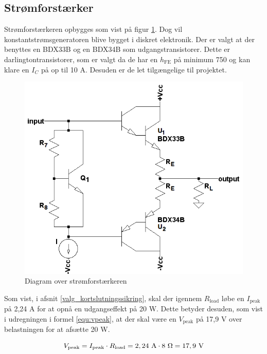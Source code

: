 \subsection{Strømforstærker}
\label{effekt_stroemforstaerker}
Strømforstærkeren opbygges som vist på figur \ref{fig:blokdiagram-stroem}. Dog vil konstantstrømsgeneratoren blive bygget i diskret elektronik. Der er valgt at der benyttes en BDX33B og en BDX34B \cite{bdx33-34-datablad} som udgangstransistorer. Dette er darlingtontransistorer, som er valgt da de har en $h_{\mathrm{FE}}$ på minimum 750 og kan klare en $I_C$ på op til 10 A. Desuden er de let tilgængelige til projektet.

\begin{figure}[h]
\centering
\includegraphics[scale=0.4]{teknisk/effektforstaerker/blokdiagram-stroemforstaerker.png}
\caption{Diagram over strømforstærkeren}
\label{fig:blokdiagram-stroem}
\end{figure}

Som vist, i afsnit \ref{valg_kortslutningssikring}, skal der igennem $R_{\mathrm{load}}$ løbe en $I_{\mathrm{peak}}$ på 2,24 A for at opnå en udgangseffekt på 20 W. Dette betyder desuden, som vist i udregningen i formel \ref{equ:vpeak}, at der skal være en $V_{\mathrm{peak}}$ på 17,9 V over belastningen for at afsætte 20 W. 

\begin{equation}
\label{equ:vpeak}
V_{\mathrm{peak}} = I_{\mathrm{peak}} \cdot R_{\mathrm{load}} = \mathrm{2,24~A \cdot 8~\ohm = 17,9~V}
\end{equation}

